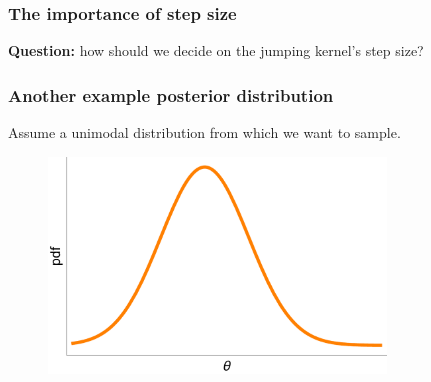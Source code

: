 \documentclass[handout]{beamer}
\begin{document}
\begin{frame}
\frametitle{The importance of step size}
\textbf{Question:} how should we decide on the jumping kernel's step size?


\end{frame}

\begin{frame}
\frametitle{Another example posterior distribution}
Assume a unimodal distribution from which we want to sample.

\begin{figure}[ht]
\centerline{\includegraphics[width=0.8\textwidth]{animations_figures/lec4_stepSizeStart1.pdf}}
\end{figure}

\end{frame}
\end{document}
